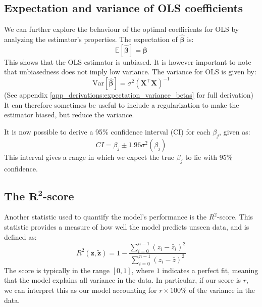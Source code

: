 \documentclass{article}
\newcommand{\EE}{\mathbb{E}}
\begin{document}
\begin{multicols}{2}
\subsection*{Expectation and variance of OLS coefficients}
We can further explore the behaviour of the optimal coefficients for OLS by analyzing the estimator's properties. The expectation of $\bm{\hat{\beta}}$ is:
$$\EE[{\bm{\hat{\beta}}}] = \bm{\beta}$$
This shows that the OLS estimator is unbiased. It is however important to note that unbiasedness does not imply low variance. The variance for OLS is given by:
$$\text{Var}[\bm{\hat{\beta}}] = \sigma^2(\mathbf{X}^\top\mathbf{X})^{-1}$$
(See appendix \ref{app_derivations:expectation_variance_betas} for full derivation) It can therefore sometimes be useful to include a regularization to make the estimator biased, but reduce the variance.

It is now possible to derive a 95$\%$ confidence interval (CI) for each $\beta_j$, given as:
\begin{equation} \label{eq:CI}
    CI = \beta_j \pm 1.96\sigma^2(\beta_j)
\end{equation}
This interval gives a range in which we expect the true $\beta_j$ to lie with $95\%$ confidence.

\subsection*{The $\mathbf{R^2}$-score}
Another statistic used to quantify the model’s performance is the $R^2$-score. This statistic provides a measure of how well the model predicts unseen data, and is defined as:
$$R^2(\bm{z}, \bm{\tilde{z}}) = 1 - \frac{\sum_{i=0}^{n-1} (z_i - \hat{z}_i)^2}{\sum_{i=0}^{n-1} (z_i - \bar{z})^2}$$
The score is typically in the range $[0,1]$, where $1$ indicates a perfect fit, meaning that the model explains all variance in the data. In particular, if our score is $r$, we can interpret this as our model accounting for $r\times100\%$ of the variance in the data. 
\end{multicols}
\newpage

\end{document}
